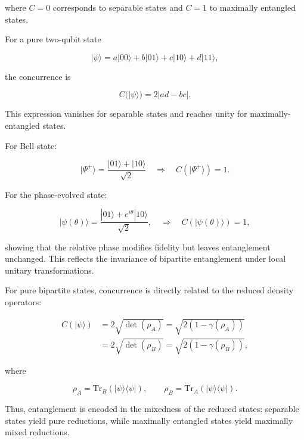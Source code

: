 where \( C=0 \) corresponds to separable states and \( C=1 \) to maximally entangled states.

\medskip

For a pure two-qubit state

\[
|\psi\rangle
=
a|00\rangle
+
b|01\rangle
+
c|10\rangle
+
d|11\rangle,
\]

the concurrence is

\begin{equation}
C(|\psi\rangle)
=
2|ad-bc|.
\label{eq:pure_state_concurrence}
\end{equation}

This expression vanishes for separable states and reaches unity for maximally-entangled states. 

\medskip

For Bell state:

\[
|\Psi^+\rangle
=
\frac{|01\rangle + |10\rangle}{\sqrt{2}}
\quad
\Rightarrow
\quad
C(|\Psi^+\rangle)=1.
\]

\medskip

For the phase-evolved state:

\begin{equation}
|\psi(\theta)\rangle
=
\frac{|01\rangle + e^{i\theta}|10\rangle}{\sqrt{2}},
\quad
\Rightarrow
\quad
C(|\psi(\theta)\rangle)
=
1,
\label{eq:phase_state_concurrence}
\end{equation}

showing that the relative phase modifies fidelity but leaves entanglement unchanged. This reflects the invariance of bipartite entanglement under local unitary transformations.

\medskip

For pure bipartite states, concurrence is directly related to the reduced density operators:

\begin{align}
C(|\psi\rangle)
&=
2\sqrt{\det(\rho_A)}
=
\sqrt{
2\left(
1-\gamma(\rho_A)
\right)
}
\nonumber
\\
&=
2\sqrt{\det(\rho_B)}
=
\sqrt{
2\left(
1-\gamma(\rho_B)
\right)
},
\label{eq:concurrence_reduced_density_relation}
\end{align}

where

\[
\rho_A
=
\mathrm{Tr}_B
\left(
|\psi\rangle\langle\psi|
\right),
\qquad
\rho_B
=
\mathrm{Tr}_A
\left(
|\psi\rangle\langle\psi|
\right).
\]

Thus, entanglement is encoded in the mixedness of the reduced states: separable states yield pure reductions, while maximally entangled states yield maximally mixed reductions.

